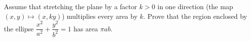 Assume that stretching the plane by a factor $k>0$ in one direction (the map $(x,y)\mapsto(x,ky)$) multiplies every area by $k$. Prove that the region enclosed by the ellipse $\dfrac{x^2}{a^2}+\dfrac{y^2}{b^2}=1$ has area $\pi ab$.
